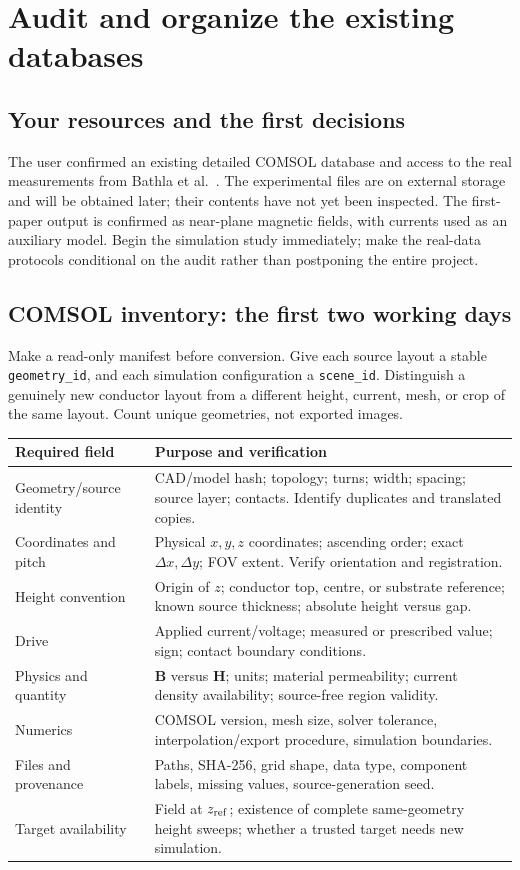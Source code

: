 \section{Audit and organize the existing databases}
\label{sec:data}
\subsection{Your resources and the first decisions}
The user confirmed an existing detailed COMSOL database and access to the real measurements from Bathla et al.~\cite{bathla}. The experimental files are on external storage and will be obtained later; their contents have not yet been inspected. The first-paper output is confirmed as near-plane magnetic fields, with currents used as an auxiliary model. Begin the simulation study immediately; make the real-data protocols conditional on the audit rather than postponing the entire project.

\subsection{COMSOL inventory: the first two working days}
Make a read-only manifest before conversion. Give each source layout a stable \texttt{geometry\_id}, and each simulation configuration a \texttt{scene\_id}. Distinguish a genuinely new conductor layout from a different height, current, mesh, or crop of the same layout. Count unique geometries, not exported images.

\begin{longtable}{P{37mm}P{114mm}}
\toprule Required field & Purpose and verification\\\midrule\endhead
Geometry/source identity & CAD/model hash; topology; turns; width; spacing; source layer; contacts. Identify duplicates and translated copies.\\
Coordinates and pitch & Physical $x,y,z$ coordinates; ascending order; exact $\Delta x,\Delta y$; FOV extent. Verify orientation and registration.\\
Height convention & Origin of $z$; conductor top, centre, or substrate reference; known source thickness; absolute height versus gap.\\
Drive & Applied current/voltage; measured or prescribed value; sign; contact boundary conditions.\\
Physics and quantity & $\mathbf B$ versus $\mathbf H$; units; material permeability; current density availability; source-free region validity.\\
Numerics & COMSOL version, mesh size, solver tolerance, interpolation/export procedure, simulation boundaries.\\
Files and provenance & Paths, SHA-256, grid shape, data type, component labels, missing values, source-generation seed.\\
Target availability & Field at $z_{\rm ref}$; existence of complete same-geometry height sweeps; whether a trusted target needs new simulation.\\\bottomrule
\end{longtable}

